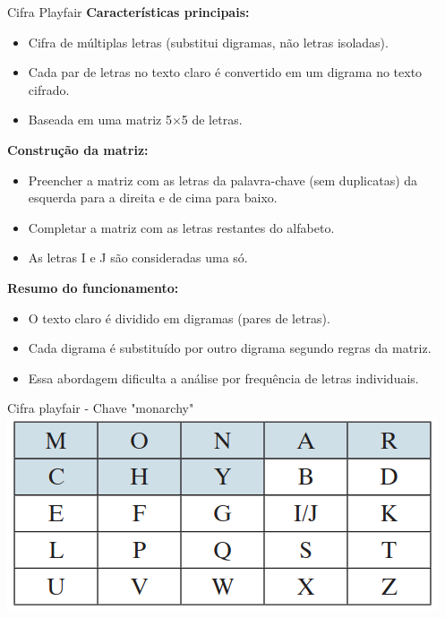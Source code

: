 \begin{frame}{Cifra Playfair}
    \textbf{Características principais:}
    \begin{itemize}
        \item Cifra de múltiplas letras (substitui digramas, não letras isoladas).
        \item Cada par de letras no texto claro é convertido em um digrama no texto cifrado.
        \item Baseada em uma matriz 5×5 de letras.
    \end{itemize}

    \medskip
    \textbf{Construção da matriz:}
    \begin{itemize}
        \item Preencher a matriz com as letras da palavra-chave (sem duplicatas) da esquerda para a direita e de cima para baixo.
        \item Completar a matriz com as letras restantes do alfabeto.
        \item As letras I e J são consideradas uma só.
    \end{itemize}

    \medskip
    \textbf{Resumo do funcionamento:}
    \begin{itemize}
        \item O texto claro é dividido em digramas (pares de letras).
        \item Cada digrama é substituído por outro digrama segundo regras da matriz.
        \item Essa abordagem dificulta a análise por frequência de letras individuais.
    \end{itemize}
\end{frame}

\begin{frame}{Cifra playfair - Chave "monarchy"}
    \centering
    \includegraphics[width=0.8\linewidth]{Figuras/Cifra-playfair.png}


\end{frame}

